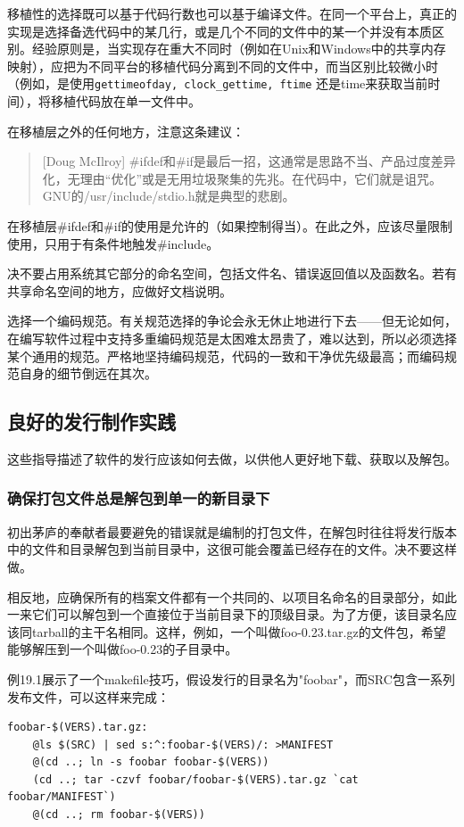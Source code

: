 \documentclass[12pt,oneside]{book}
\begin{document}
移植性的选择既可以基于代码行数也可以基于编译文件。在同一个平台上，真正的实现是选择备选代码中的某几行，或是几个不同的文件中的某一个并没有本质区别。经验原则是，当实现存在重大不同时（例如在Unix和Windows中的共享内存映射），应把为不同平台的移植代码分离到不同的文件中，而当区别比较微小时（例如，是使用\verb+gettimeofday, clock_gettime, ftime+ 还是time来获取当前时间），将移植代码放在单一文件中。

在移植层之外的任何地方，注意这条建议：
\begin{quote}[Doug McIlroy]
\#{}ifdef和\#{}if是最后一招，这通常是思路不当、产品过度差异化，无理由“优化”或是无用垃圾聚集的先兆。在代码中，它们就是诅咒。GNU的/usr/include/stdio.h就是典型的悲剧。
\end{quote}

在移植层\#{}ifdef和\#{}if的使用是允许的（如果控制得当）。在此之外，应该尽量限制使用，只用于有条件地触发\#{}include。

决不要占用系统其它部分的命名空间，包括文件名、错误返回值以及函数名。若有共享命名空间的地方，应做好文档说明。

选择一个编码规范。有关规范选择的争论会永无休止地进行下去——但无论如何，在编写软件过程中支持多重编码规范是太困难太昂贵了，难以达到，所以必须选择某个通用的规范。严格地坚持编码规范，代码的一致和干净优先级最高；而编码规范自身的细节倒远在其次。

\subsection{良好的发行制作实践}
这些指导描述了软件的发行应该如何去做，以供他人更好地下载、获取以及解包。

\subsubsection{确保打包文件总是解包到单一的新目录下}
初出茅庐的奉献者最要避免的错误就是编制的打包文件，在解包时往往将发行版本中的文件和目录解包到当前目录中，这很可能会覆盖已经存在的文件。决不要这样做。

相反地，应确保所有的档案文件都有一个共同的、以项目名命名的目录部分，如此一来它们可以解包到一个直接位于当前目录下的顶级目录。为了方便，该目录名应该同tarball的主干名相同。这样，例如，一个叫做foo-0.23.tar.gz的文件包，希望能够解压到一个叫做foo-0.23的子目录中。

例19.1展示了一个makefile技巧，假设发行的目录名为"foobar"，而SRC包含一系列发布文件，可以这样来完成：

\begin{Verbatim}[label = 例19.1  tar文件包制作过程]
foobar-$(VERS).tar.gz:
	@ls $(SRC) | sed s:^:foobar-$(VERS)/: >MANIFEST
	@(cd ..; ln -s foobar foobar-$(VERS))
	(cd ..; tar -czvf foobar/foobar-$(VERS).tar.gz `cat foobar/MANIFEST`)
	@(cd ..; rm foobar-$(VERS))
\end{Verbatim}
\end{document}
